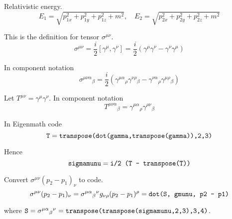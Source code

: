 Relativistic energy.
\begin{equation*}
E_1=\sqrt{p_{1x}^2+p_{1y}^2+p_{1z}^2+m^2},\quad
E_2=\sqrt{p_{2x}^2+p_{2y}^2+p_{2z}^2+m^2}
\end{equation*}

This is the definition for tensor $\sigma^{\mu\nu}$.
\begin{equation*}
\sigma^{\mu\nu}=\frac{i}{2}\left[\gamma^\mu,\gamma^\nu\right]
=\frac{i}{2}\left(\gamma^\mu\gamma^\nu-\gamma^\nu\gamma^\mu\right)
\end{equation*}

In component notation
\begin{equation*}
\sigma^{\mu\nu\alpha}{}_\beta
=\frac{i}{2}\left(\gamma^{\mu\alpha}{}_\rho\gamma^{\nu\rho}{}_\beta
-\gamma^{\nu\alpha}{}_\rho\gamma^{\mu\rho}{}_\beta\right)
\end{equation*}

Let $T^{\mu\nu}=\gamma^\mu\gamma^\nu$.
In component notation
\begin{equation*}
T^{\mu\nu\alpha}{}_\beta
=\gamma^{\mu\alpha}{}_\rho\gamma^{\rho\nu}{}_\beta
\end{equation*}

In Eigenmath code
\begin{equation*}
\text{\tt T}=\text{\tt transpose(dot(gamma,transpose(gamma)),2,3)}
\end{equation*}

Hence
\begin{equation*}
\text{\tt sigmamunu}=\text{\tt i/2 (T - transpose(T))}
\end{equation*}

Convert $\sigma^{\mu\nu}(p_2-p_1)_\nu$ to code.
\begin{equation*}
\sigma^{\mu\nu}(p_2-p_1)_\nu
=\sigma^{\mu\alpha}{}_\beta{}^{\nu}g_{\nu\rho}(p_2-p_1)^\rho
=\text{\tt dot(S, gmunu, p2 - p1)}
\end{equation*}

where $\text{\tt S}=\sigma^{\mu\alpha}{}_\beta{}^\nu
=\text{\tt transpose(transpose(sigmamunu,2,3),3,4)}$.


